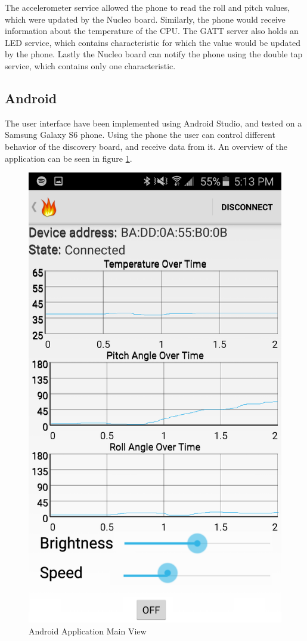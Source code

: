 \documentclass[12pt]{article}
\begin{document}
The accelerometer service allowed the phone to read the roll and pitch values, which were updated by the Nucleo board. Similarly, the phone would receive information about the temperature of the CPU. The GATT server also holds an LED service, which contains characteristic for which the value would be updated by the phone. Lastly the Nucleo board can notify the phone using the double tap service, which contains only one characteristic.

\subsection{Android}
The user interface have been implemented using Android Studio, and tested on a Samsung Galaxy S6 phone. Using the phone the user can control different behavior of the discovery board, and receive data from it. An overview of the application can be seen in figure \ref{fig:android}.

\begin{figure}[!htb]
 \centering
 \includegraphics[scale=0.15]{images/android.png}
 \caption{Android Application Main View}
 \label{fig:android}
\end{figure}
\end{document}
